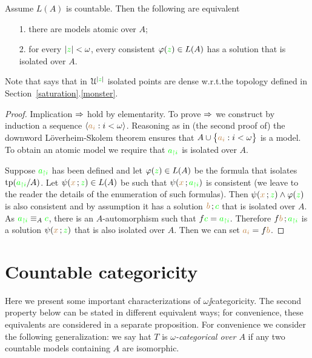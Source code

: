 \documentclass[creche.tex]{subfiles}
\begin{document}
\begin{proposition}\label{prop_idolated_type_dense}
Assume $L(A)$ is countable. Then the following are equivalent
\begin{itemize}
\item[1.] there are models atomic over $A$;
\item[2.] for every $|{\color{green} z}|<\omega$, every consistent $\varphi({\color{green} z})\in L(A)$ has a solution that is isolated over $A$.
\end{itemize}
\end{proposition} 
Note that  says that in $\EuScript U^{|{\color{green} z}|}$ isolated points are dense w.r.t.\@ the topology defined in Section~\ref{saturation}.\ref{monster}.
\begin{proof}
Implication $\Rightarrow$ hold by elementarity. To prove $\Rightarrow$ we construct by induction a sequence $\langle{\color{brown}a_i}:i<\omega\rangle$. Reasoning as in (the second proof of) the downword L\"overheim-Skolem theorem ensures that $A\cup\big\{{\color{brown} a_i}:i<\omega\big\}$ is a model. To obtain an atomic model we require that ${\color{green} a_{\restriction i}}$ is isolated over $A$. 

Suppose ${\color{green} a_{\restriction i}}$ has been defined and let $\varphi({\color{green} z})\in L(A)$ be the formula that isolates ${\rm tp}({\color{green} a_{\restriction i}}/A)$. Let $\psi({\color{brown} x}\,;{\color{green} z})\in L(A)$ be such that $\psi({\color{brown} x}\,;{\color{green} a_{\restriction i}})$ is consistent (we leave to the reader the details of the enumeration of such formulas). Then $\psi({\color{brown} x}\,;{\color{green} z})\wedge\varphi({\color{green} z})$ is also consistent and by assumption it has a solution ${\color{brown} b}\,;{\color{green} c}$ that is isolated over $A$. As ${\color{green} a_{\restriction i}}\equiv_A{\color{green} c}$, there is an $A$-automorphism such that $f{\color{green} c}={\color{green} a_{\restriction i}}$. Therefore $f{\color{brown} b}\,;{\color{green} a_{\restriction i}}$ is a solution $\psi({\color{brown} x}\,;{\color{green} z})$ that is also isolated over $A$. Then we can set ${\color{brown} a_i}=f{\color{brown} b}$. 
\end{proof}


\section{Countable categoricity}

Here we present some important characterizations of $\omega\jj$categoricity. The second property below can be stated in different equivalent ways; for convenience, these equivalents are considered in a separate proposition. For convenience we consider the following generalization: we say hat $T$ is \emph{$\omega$-categorical over $A$\/} if any two countable models containing $A$ are isomorphic.
\end{document}
